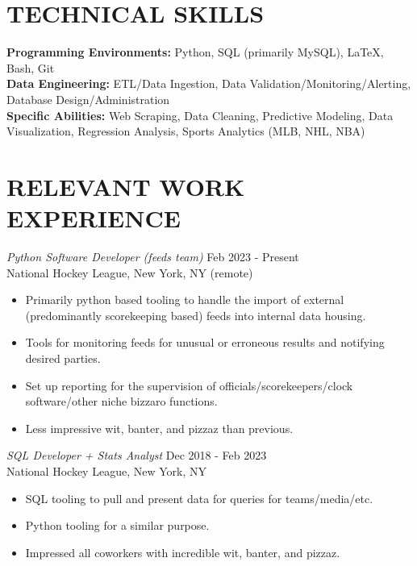 \documentclass[margin]{res}
\begin{document}
\begin{resume}
\section{TECHNICAL SKILLS} 
\textbullet\hspace{3pt} \textbf{Programming Environments:} Python, SQL (primarily MySQL), \LaTeX, Bash, Git %
\\\textbullet \hspace{3pt} \textbf{Data Engineering:} ETL/Data Ingestion, Data Validation/Monitoring/Alerting, Database Design/Administration
\\\textbullet \hspace{3pt} \textbf{Specific Abilities:} Web Scraping, Data Cleaning, Predictive Modeling, Data Visualization, Regression Analysis, Sports Analytics (MLB, NHL, NBA)

\section{RELEVANT WORK EXPERIENCE}
\textit{Python Software Developer (feeds team)} \hfill Feb 2023 - Present
\\National Hockey League, New York, NY (remote)
\begin{itemize}
\item[-] Primarily python based tooling to handle the import of external (predominantly scorekeeping based) feeds into internal data housing.
\vspace{-3pt}\item[-] Tools for monitoring feeds for unusual or erroneous results and notifying desired parties.
\vspace{-3pt}\item[-] Set up reporting for the supervision of officials/scorekeepers/clock software/other niche bizzaro functions.
\vspace{-3pt}\item[-] Less impressive wit, banter, and pizzaz than previous.
\end{itemize}

\textit{SQL Developer + Stats Analyst} \hfill Dec 2018 - Feb 2023
\\National Hockey League, New York, NY
\begin{itemize}
\item[-] SQL tooling to pull and present data for queries for teams/media/etc.
\vspace{-3pt}\item[-] Python tooling for a similar purpose.
\vspace{-3pt}\item[-] Impressed all coworkers with incredible wit, banter, and pizzaz.
\end{itemize}


\end{resume}
\end{document}
